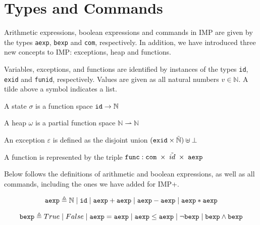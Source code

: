 \section{Types and Commands}

Arithmetic expressions, boolean expressions and commands in IMP are given by the types \verb|aexp|, \verb|bexp| and \verb|com|, respectively. In addition, we have introduced three new concepts to IMP: exceptions, heap and functions.

Variables, exceptions, and functions are identified by instances of the types \verb|id|, \verb|exid| and \verb|funid|, respectively. Values are given as all natural numbers $v\in\mathbb{N}$. A tilde above a symbol indicates a list.

A state $\sigma$ is a function space $\verb|id| \rightarrow \mathbb{N}$

A heap $\omega$ is a partial function space $\mathbb{N} \rightharpoonup \mathbb{N}$

An exception $\varepsilon$ is defined as the disjoint union $(\verb|exid|\times\tilde{\mathbb{N}})\uplus\bot$

A function is represented by the triple $\verb|func|: \verb|com| \; \times \; \tilde{id} \; \times \; \verb|aexp|$

Below follows the definitions of arithmetic and boolean expressions, as well as all commands, including the ones we have added for IMP+.

\begin{equation}
\verb|aexp| \triangleq \mathbb{N} \;|\; \verb|id| \;|\; \verb|aexp| + \verb|aexp| \;|\;  \verb|aexp| - \verb|aexp| \;|\;  \verb|aexp| * \verb|aexp|
\end{equation}

\begin{equation}
\verb|bexp| \triangleq True \;|\; False \;|\; \verb|aexp| = \verb|aexp| \;|\; \verb|aexp| \leq \verb|aexp| \;|\; \neg\verb|bexp| \;|\; \verb|bexp| \wedge \verb|bexp|
\end{equation}

